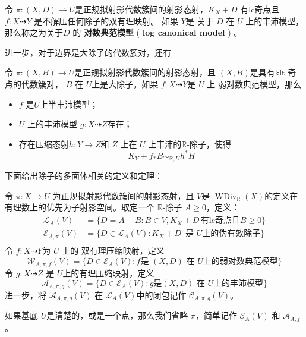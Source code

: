 \begin{definition}
  令 $ \pi:(X, D)\to U $是正规拟射影代数簇间的射影态射，$ K_X+D $ 有lc奇点且$ f: X\dashrightarrow Y $ 是不解压任何除子的双有理映射。 如果 $ Y $是 关于 $D$ 在 $U$ 上的丰沛模型，那么称之为关于$D$ 的 \textbf{对数典范模型} ( \textbf{log canonical model} ) 。
\end{definition}

进一步，对于边界是大除子的代数簇对，还有
\begin{lemma}\cite[lemma 3.9.3]{BCHM10} 令 $ \pi:(X,B)\to U $是正规拟射影代数簇间的射影态射，且 $(X, B)$是具有klt 奇点的代数簇对，  $B$ 在 $U$上是大除子。如果 $f:X\dashrightarrow Y$是 $U$ 上 弱对数典范模型，那么
  \begin{itemize}
    \item $f$ 是$U$上半丰沛模型；
    \item  $U$ 上的丰沛模型  $g:X \dashrightarrow Z$存在；
    \item  存在压缩态射$h:Y\to Z$和 $Z$ 上在 $U$ 上丰沛的$\mathbb{R}$-除子，使得 
      \[ K_{Y}+f_*B\sim_{\mathbb{R},U} h^*H \]
  \end{itemize}
\end{lemma}
下面给出除子的多面体相关的定义和定理：
\begin{definition}\label{polytopeofdivisor}
  \cite[Definition 1.1.4]{BCHM10} 令 $ \pi: X\to U $ 为正规拟射影代数簇间的射影态射，且 $ V $是 $ \operatorname{WDiv}_{\mathbb{R}}(X) $的定义在有理数上的优先为子射影空间。取定一个 $ \mathbb{R} $-除子 $ A\geqslant 0 $，定义：
  \[
    \begin{aligned}
      \mathcal{L}_A(V)       & =\{D=A+B:B \in V,  K_X+D\, \text{有lc奇点且} B\geqslant0 \} \\
    \mathcal{E}_{A,\pi}(V) & =\{D\in \mathcal{L}_A(V): K_X+D\, \text{ 是 } U \text{上的伪有效除子}\}  \\
    \end{aligned}
  \]
  令 $ f:X \dashrightarrow Y$为 $U$ 上的 双有理压缩映射，定义
  \[ \mathcal{W}_{A,\pi,f}(V)=\{D\in \mathcal{E}_{A}(V): f \text{是   } (X,D) \text{ 在 }U \text{上的弱对数典范模型}\} \]
  令 $g:X\dashrightarrow Z  $ 是 $ U $上的有理压缩映射，定义
  \[ \mathcal{A}_{A,\pi,g}(V)=\{D\in \mathcal{E}_{A}(V): g \text{是} (X,D) \text{ 在 }U \text{上的丰沛模型}\} \]
  进一步，将 $ \mathcal{A}_{A,\pi,g}(V) $ 在 $\mathcal{L}_{A}(V)$中的闭包记作 $ \mathcal{C}_{A,\pi,g}(V) $。

  如果基底 $U$是清楚的，或是一个点，那么我们省略 $\pi$，简单记作 $\mathcal{E}_{A}(V)$ 和 $\mathcal{A}_{A,f}$。
\end{definition}
